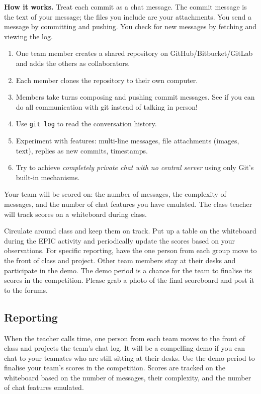 \documentclass[twoside=false,DIV=14]{scrartcl}
\begin{document}
\textbf{How it works.}  Treat each commit as a chat message.  The commit message is the text of your message; the files you include are your attachments.  You send a message by committing and pushing.  You check for new messages by fetching and viewing the log.

\begin{enumerate}
    \item One team member creates a shared repository on GitHub/Bitbucket/GitLab and adds the others as collaborators.
    \item Each member clones the repository to their own computer.
    \item Members take turns composing and pushing commit messages. See if you can do all communication with git instead of talking in person!
    \item Use \texttt{git log} to read the conversation history.
    \item Experiment with features: multi-line messages, file attachments (images, text), replies as new commits, timestamps.
    \item Try to achieve \emph{completely private chat with no central server} using only Git's built-in mechanisms.
\end{enumerate}

Your team will be scored on: the number of messages, the complexity of messages, and the number of chat features you have emulated.  The class teacher will track scores on a whiteboard during class.

\begin{teacher}
Circulate around class and keep them on track. Put up a table on the whiteboard during the EPIC activity and periodically update the scores based on your observations.  For specific reporting, have the one person from each group move to the front of class and project.  Other team members stay at their desks and participate in the demo.  The demo period is a chance for the team to finalise its scores in the competition.  Please grab a photo of the final scoreboard and post it to the forums.
\end{teacher}

\subsection*{Reporting}

When the teacher calls time, one person from each team moves to the front of class and projects the team's chat log.  It will be a compelling demo if you can chat to your teamates who are still sitting at their desks.  Use the demo period to finalise your team's scores in the competition.  Scores are tracked on the whiteboard based on the number of messages, their complexity, and the number of chat features emulated.
\end{document}
